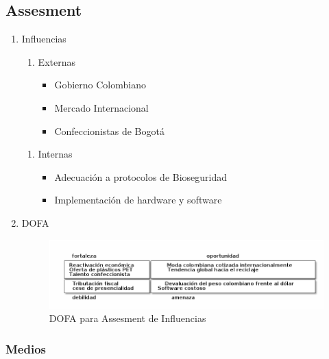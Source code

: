 \documentclass[11pt]{article}
\begin{document}
\subsection{Assesment}
\label{sec:org02d7518}
\begin{enumerate}
\item Influencias
\label{sec:orgc53e3eb}

\begin{enumerate}
\item Externas

\begin{itemize}
\item Gobierno Colombiano
\item Mercado Internacional
\item Confeccionistas de Bogotá
\end{itemize}
\end{enumerate}


\begin{enumerate}
\item Internas

\begin{itemize}
\item Adecuación a protocolos de Bioseguridad
\item Implementación de hardware y software
\end{itemize}
\end{enumerate}

\item DOFA
\label{sec:orgb240747}
\begin{figure}[htbp]
\centering
\includegraphics[width=.9\linewidth]{./assets/build/dofa.png}
\caption{\label{fig:org2cd12fa}DOFA para Assesment de Influencias}
\end{figure}
\end{enumerate}


\subsubsection{Medios}
\label{sec:org776dd74}
\end{document}
